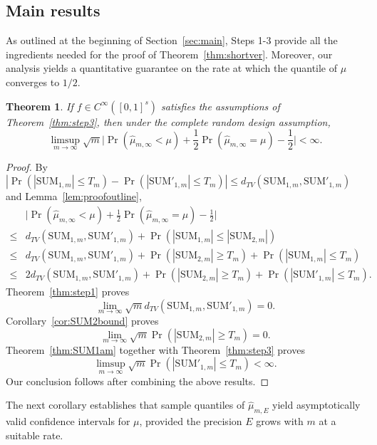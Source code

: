 \documentclass{article}
\newtheorem{theorem}{Theorem}
\theoremstyle{definition}
\renewcommand{\ge}{\geqslant}
\renewcommand{\leq}{\leqslant}
\begin{document}
\subsection{Main results}\label{subsec:main}
As outlined at the beginning of Section~\ref{sec:main}, Steps 1-3 provide all the ingredients needed for the proof of Theorem~\ref{thm:shortver}. Moreover, our analysis yields a quantitative guarantee on the rate at which the quantile of $\mu$ converges to $1/2$.
\begin{theorem}\label{thm:convergetomedian}
    If $f\in C^{\infty}([0,1]^s)$ satisfies the assumptions of Theorem~\ref{thm:step3}, then under the complete random design assumption,
    \begin{equation*}
    \limsup_{m\to\infty} \sqrt{m}\Big|\Pr(\hat{\mu}_{m,\infty}<\mu)+\frac{1}{2}\Pr(\hat{\mu}_{m,\infty}=\mu)-\frac{1}{2}\Big|<\infty.
    \end{equation*}
\end{theorem}
\begin{proof}
    By  $|\Pr(|\mathrm{SUM}_{1,m}|\leq T_m)-\Pr(|\mathrm{SUM}'_{1,m}|\leq T_m)|\leq d_{TV}(\mathrm{SUM}_{1,m},\mathrm{SUM}'_{1,m})$ and Lemma~\ref{lem:proofoutline},
    \begin{align*}
       & \Big|\Pr(\hat{\mu}_{m,\infty}<\mu)+\frac{1}{2}\Pr(\hat{\mu}_{m,\infty}=\mu)-\frac{1}{2}\Big|\\
        \leq & d_{TV}(\mathrm{SUM}_{1,m},\mathrm{SUM}'_{1,m})+ \Pr(|\mathrm{SUM}_{1,m}|\leq |\mathrm{SUM}_{2,m}| )\\
        \leq & d_{TV}(\mathrm{SUM}_{1,m},\mathrm{SUM}'_{1,m})+ \Pr(|\mathrm{SUM}_{2,m}|\ge T_m)+\Pr(|\mathrm{SUM}_{1,m}|\leq T_m)\\
        \leq & 2d_{TV}(\mathrm{SUM}_{1,m},\mathrm{SUM}'_{1,m})+ \Pr(|\mathrm{SUM}_{2,m}|\ge T_m)+\Pr(|\mathrm{SUM}'_{1,m}|\leq T_m).
    \end{align*}
    Theorem~\ref{thm:step1} proves 
    $$\lim_{m\to\infty}\sqrt{m}d_{TV}(\mathrm{SUM}_{1,m},\mathrm{SUM}'_{1,m})= 0.$$ 
    Corollary~\ref{cor:SUM2bound} proves 
    $$\lim_{m\to\infty}\sqrt{m}\Pr(|\mathrm{SUM}_{2,m}|\ge T_m)= 0.$$ Theorem~\ref{thm:SUM1am} together with Theorem~\ref{thm:step3} proves $$\limsup_{m\to\infty} \sqrt{m} \Pr(|\mathrm{SUM}'_{1,m}|\leq T_m)<\infty.$$ 
    Our conclusion follows after combining the above results.
\end{proof}

The next corollary establishes that sample quantiles of $\hat{\mu}_{m,E}$ yield asymptotically valid confidence intervals for $\mu$, provided the precision $E$ grows with $m$ at a suitable rate.
\end{document}
